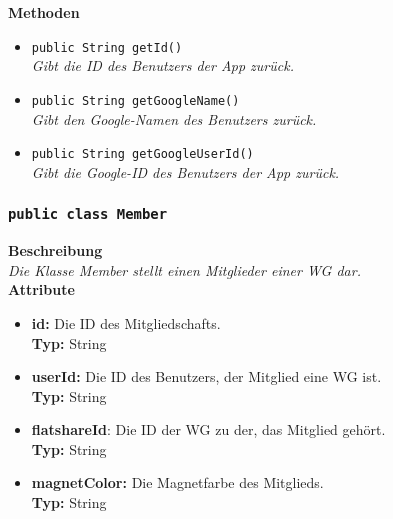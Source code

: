 	\textbf{Methoden}
	\begin{itemize}
	\item{\texttt{public String getId()}}\\
	\textit{Gibt die ID des Benutzers der App zurück.}\\
	\item{\texttt{public String getGoogleName()}}\\
	\textit{Gibt den Google-Namen des Benutzers zurück.}\\
	
	\item{\texttt{public String getGoogleUserId()}}\\
	\textit{Gibt die Google-ID des Benutzers der App zurück.}\\
	\end{itemize}

	

\subsubsection{\texttt{public class Member}}

	\textbf{Beschreibung} \\
	\textit{Die Klasse Member stellt einen Mitglieder einer WG dar.} \\
	
	\textbf{Attribute}
	\begin{itemize}
		\item \textbf{id:} Die ID des Mitgliedschafts. \\
		\textbf{Typ:} String
		\item \textbf{userId:} Die ID des Benutzers, der Mitglied eine WG ist. \\
		\textbf{Typ:} String
		\item \textbf{flatshareId}: Die ID der WG zu der, das Mitglied gehört. \\
		\textbf{Typ:} String
		\item \textbf{magnetColor:} Die Magnetfarbe des Mitglieds. \\
		\textbf{Typ:} String
	\end{itemize}


